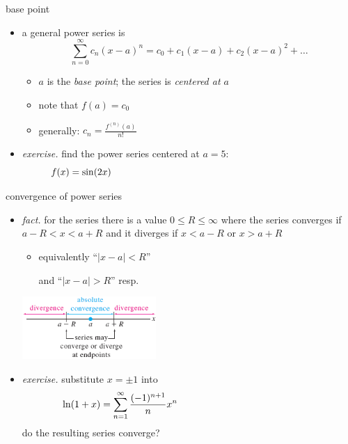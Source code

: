 \documentclass[dvipsnames,colorlinks]{beamer}
\newcommand{\ds}{\displaystyle}
\begin{document}
\begin{frame}{base point}

\begin{itemize}
\item a general power series is
    $$\sum_{n=0}^\infty c_n (x-a)^n = c_0 + c_1 (x-a) + c_2 (x-a)^2 + \dots$$
    \begin{itemize}
    \item $a$ is the \emph{base point}; the series is \emph{centered at $a$}
    \item note that $f(a)=c_0$
    \item generally: \quad $\ds c_n = \frac{f^{(n)}(a)}{n!}$
    \end{itemize}
\item \emph{exercise.}  find the power series centered at $a=5$:
    $$f(x) = \sin(2x) \hspace{80mm}$$

\vspace{30mm}
\end{itemize}
\end{frame}


\begin{frame}{convergence of power series}

\begin{itemize}
\item \emph{fact.} for the series
there is a value $0 \le R \le \infty$ where the series converges if $a-R < x < a+R$ and it diverges if $x<a-R$ or $x>a+R$
    \begin{itemize}
    \item equivalently ``$|x-a|<R$''
    
     and ``$|x-a|>R$'' resp.
    \end{itemize}

\vspace{-10mm}

\hfill \includegraphics[width=0.4\textwidth]{figs/convergediverge}

\vspace{-10mm}
\item \emph{exercise.} substitute $x=\pm1$ into
   $$\ln(1+x) = \sum_{n=1}^\infty \frac{(-1)^{n+1}}{n} x^n \hspace{50mm}$$
do the resulting series converge?

\vspace{25mm}
\end{itemize}
\end{frame}
\end{document}

